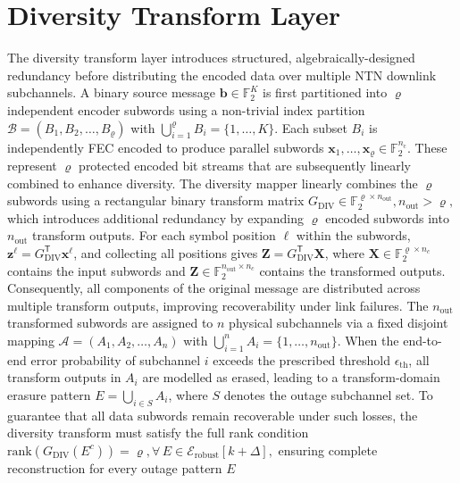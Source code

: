 \documentclass[journal]{IEEEtran}
\begin{document}
\section{Diversity Transform Layer}
\label{sec:diversity_transform}
The diversity transform layer introduces structured, algebraically-designed redundancy before distributing the encoded data over multiple NTN downlink subchannels. A binary source message $\mathbf{b} \in \mathbb{F}_2^K$ is first 
partitioned into $\varrho$ independent encoder subwords using a 
non-trivial index partition 
$\mathcal{B} = (B_1, B_2, \ldots, B_\varrho)$ 
with $\bigcup_{i=1}^\varrho B_i = \{1,\ldots,K\}$. 
Each subset $B_i$ is independently FEC encoded to produce 
parallel subwords $\mathbf{x}_1,\ldots,\mathbf{x}_\varrho \in 
\mathbb{F}_2^{n_{\mathrm{c}}}$. These represent $\varrho$ protected 
encoded bit streams that are subsequently linearly combined to enhance diversity. The 
diversity mapper linearly combines the $\varrho$ subwords using a 
rectangular binary transform matrix $
G_{\text{DIV}} \in \mathbb{F}_{2}^{\varrho \times n_{\text{out}}}, 
 n_{\text{out}} > \varrho,$ which introduces additional redundancy by expanding $\varrho$ encoded 
subwords into $n_{\text{out}}$ transform outputs. For each symbol position $\ell$ within the subwords, 
$\mathbf{z}^{\ell} = G_{\text{DIV}}^{\mathsf{T}} \mathbf{x}^{\ell}$, 
and collecting all positions gives 
$\mathbf{Z} = G_{\text{DIV}}^{\mathsf{T}}\mathbf{X}$, 
where $\mathbf{X} \in \mathbb{F}_2^{\varrho\times n_c}$ contains the 
input subwords and $\mathbf{Z} \in \mathbb{F}_2^{n_{\text{out}}\times 
n_c}$ contains the transformed outputs. Consequently, all components 
of the original message are distributed across multiple transform 
outputs, improving recoverability under link failures. 
The $n_{\text{out}}$ transformed subwords are assigned to $n$ physical 
subchannels via a fixed disjoint mapping 
$\mathcal{A} = (A_1, A_2, \ldots, A_n)$ 
with $\bigcup_{i=1}^n A_i = \{1,\ldots,n_{\text{out}}\}$. 
When the end-to-end error probability of subchannel $i$ 
exceeds the prescribed threshold $\epsilon_{\mathrm{th}}$, 
all transform outputs in $A_i$ are modelled as erased, 
leading to a transform-domain erasure pattern 
$E = \bigcup_{i\in S} A_i$, where $S$ denotes the outage subchannel set. To guarantee that all  data subwords remain recoverable under such losses, the diversity 
transform must satisfy the full rank condition
$ \mathrm{rank}\!\left(G_{\text{DIV}}(E^{c})\right)=\varrho, 
 \forall\,E \in \mathcal{E}_{\mathrm{robust}}[k+\Delta],$
 ensuring complete reconstruction for every outage pattern $E$ 
\end{document}
